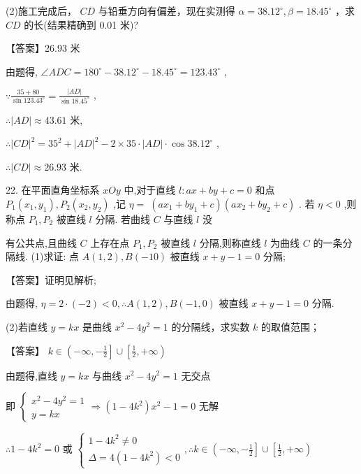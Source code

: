 \documentclass[10pt]{article}
\begin{document}
(2)施工完成后， \({CD}\) 与铅垂方向有偏差，现在实测得 \(\alpha  = {38.12}^{ \circ  },\beta  = {18.45}^{ \circ  }\) ，求 \({CD}\) 的长(结果精确到 0.01 米)?

【答案】26.93 米

由题得, \(\angle {ADC} = {180}^{ \circ  } - {38.12}^{ \circ  } - {18.45}^{ \circ  } = {123.43}^{ \circ  }\) ,

\(\because \frac{{35} + {80}}{\sin {123.43}^{ \circ  }} = \frac{\left| AD\right| }{\sin {18.45}^{ \circ  }}\) ,

\(\therefore \left| {AD}\right|  \approx  {43.61}\) 米,

\(\therefore {\left| CD\right| }^{2} = {35}^{2} + {\left| AD\right| }^{2} - 2 \times  {35} \cdot  \left| {AD}\right|  \cdot  \cos {38.12}^{ \circ  }\) ,

\(\therefore \left| {CD}\right|  \approx  {26.93}\) 米.

22. 在平面直角坐标系 \({xOy}\) 中,对于直线 \(l : {ax} + {by} + c = 0\) 和点 \({P}_{1}\left( {{x}_{1},{y}_{1}}\right) ,{P}_{2}\left( {{x}_{2},{y}_{2}}\right)\) ,记 \(\eta  = \; \left( {a{x}_{1} + b{y}_{1} + c}\right) \left( {a{x}_{2} + b{y}_{2} + c}\right)\) . 若 \(\eta  < 0\) ,则称点 \({P}_{1},{P}_{2}\) 被直线 \(l\) 分隔. 若曲线 \(C\) 与直线 \(l\) 没

有公共点,且曲线 \(C\) 上存在点 \({P}_{1},{P}_{2}\) 被直线 \(l\) 分隔,则称直线 \(l\) 为曲线 \(C\) 的一条分隔线. (1)求证: 点 \(A\left( {1,2}\right) ,B\left( {-{10}}\right)\) 被直线 \(x + y - 1 = 0\) 分隔;

【答案】证明见解析;

由题得, \(\eta  = 2 \cdot  \left( {-2}\right)  < 0,\therefore A\left( {1,2}\right) ,B\left( {-1,0}\right)\) 被直线 \(x + y - 1 = 0\) 分隔.

(2)若直线 \(y = {kx}\) 是曲线 \({x}^{2} - 4{y}^{2} = 1\) 的分隔线，求实数 \(k\) 的取值范围；

【答案】 \(k \in  \left( {-\infty , - \frac{1}{2}}\right\rbrack   \cup  \left\lbrack  {\frac{1}{2}, + \infty }\right)\)

由题得,直线 \(y = {kx}\) 与曲线 \({x}^{2} - 4{y}^{2} = 1\) 无交点

即 \(\left\{  {\begin{array}{l} {x}^{2} - 4{y}^{2} = 1 \\  y = {kx} \end{array} \Rightarrow  \left( {1 - 4{k}^{2}}\right) {x}^{2} - 1 = 0}\right.\) 无解

\(\therefore 1 - 4{k}^{2} = 0\) 或 \(\left\{  {\begin{array}{l} 1 - 4{k}^{2} \neq  0 \\  \Delta  = 4\left( {1 - 4{k}^{2}}\right)  < 0 \end{array},\therefore k \in  \left( {-\infty , - \frac{1}{2}}\right\rbrack   \cup  \left\lbrack  {\frac{1}{2}, + \infty }\right) }\right.\)
\end{document}
